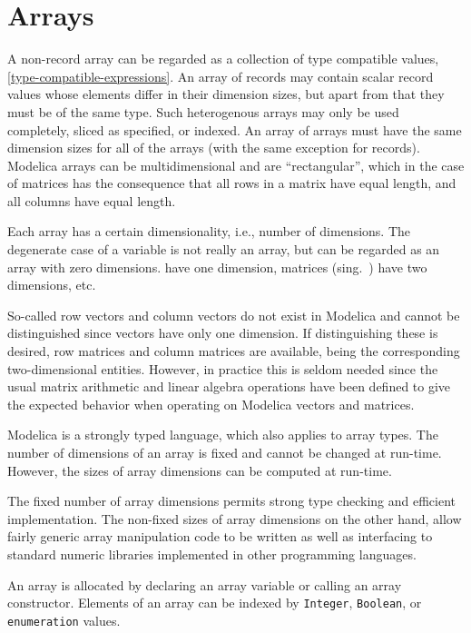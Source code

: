 \chapter{Arrays}\label{arrays}

A non-record array can be regarded as a collection of type compatible values, \cref{type-compatible-expressions}.
An array of records may contain scalar record values whose elements differ in their dimension sizes, but apart from that they must be of the same type.
Such heterogenous arrays may only be used completely, sliced as specified, or indexed.
An array of arrays must have the same dimension sizes for all of the arrays (with the same exception for records).
Modelica arrays can be multidimensional and are ``rectangular'',
which in the case of matrices has the consequence that all rows in a
matrix have equal length, and all columns have equal length.

Each array has a certain dimensionality, i.e., number of dimensions.
The degenerate case of a  variable is not really an array, but can be regarded as an array with zero dimensions.
 have one dimension, matrices (sing.\ ) have two dimensions, etc.

So-called row vectors and column vectors do not exist in Modelica and cannot be distinguished since vectors have only one dimension.
If distinguishing these is desired, row matrices and column matrices are available, being the corresponding two-dimensional entities.
However, in practice this is seldom needed since the usual matrix arithmetic and linear algebra operations have been defined to give the expected behavior when operating on Modelica vectors and matrices.

Modelica is a strongly typed language, which also applies to array
types. The number of dimensions of an array is fixed and cannot be
changed at run-time. However, the sizes of array dimensions can
be computed at run-time.

The fixed number of array dimensions permits strong type checking and efficient implementation.  The non-fixed sizes of array
dimensions on the other hand, allow fairly generic array manipulation code to be written as well as interfacing to standard
numeric libraries implemented in other programming languages.

An array is allocated by declaring an array variable or calling an array
constructor. Elements of an array can be indexed by \lstinline!Integer!, \lstinline!Boolean!, or
\lstinline!enumeration! values.


